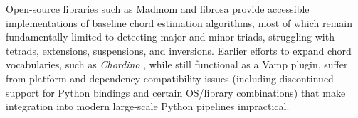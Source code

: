 \documentclass{article}
\begin{document}

Open-source libraries such as Madmom \citep{bock2016madmom} and librosa \citep{mcfee2015librosa} provide accessible implementations of baseline chord estimation algorithms, most of which remain fundamentally limited to detecting major and minor triads, struggling with tetrads, extensions, suspensions, and inversions. Earlier efforts to expand chord vocabularies, such as \textit{Chordino} \citep{mauch2010approximate}, while still functional as a Vamp plugin, suffer from platform and dependency compatibility issues (including discontinued support for Python bindings and certain OS/library combinations) that make integration into modern large-scale Python pipelines impractical.
\end{document}
